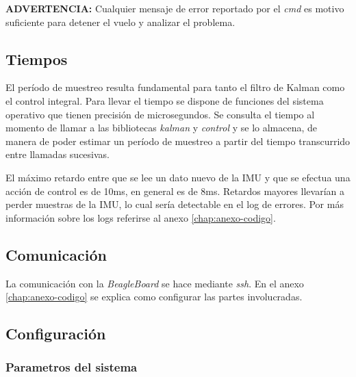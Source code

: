 \documentclass[main]{subfiles}
\begin{document}
\textbf{ADVERTENCIA:} Cualquier mensaje de error reportado por el \textit{cmd} es motivo suficiente para detener el vuelo y analizar el problema.

\subsection{Tiempos}
\label{sec:software:tiempos}

El per\'iodo de muestreo resulta fundamental para tanto el filtro de Kalman como el control integral. Para llevar el tiempo se dispone de funciones del sistema operativo que tienen precisi\'on de microsegundos. Se consulta el tiempo al momento de llamar a las bibliotecas \textit{kalman} y \textit{control} y se lo almacena, de manera de poder estimar un per\'iodo de muestreo a partir del tiempo transcurrido entre llamadas sucesivas.

El m\'aximo retardo entre que se lee un dato nuevo de la IMU y que se efectua una acci\'on de control es de 10ms, en general es de 8ms. Retardos mayores llevar\'ian a perder muestras de la IMU, lo cual ser\'ia detectable en el log de errores. Por m\'as informaci\'on sobre los logs referirse al anexo \ref{chap:anexo-codigo}.

\subsection{Comunicaci\'on}
\label{sec:software-comm}

La comunicaci\'on con la \textit{BeagleBoard} se hace mediante \textit{ssh}. En el anexo \ref{chap:anexo-codigo} se explica como configurar las partes involucradas.

\subsection{Configuraci\'on}
\label{sec:software-config}

\subsubsection{Parametros del sistema}
\label{sec:software:param-del-sistema}
\end{document}
